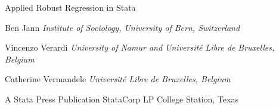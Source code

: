 {

\noindent
{\Huge
Applied Robust Regression in Stata

}

\vfill

\noindent
Ben Jann\hfil\break
{\it Institute of Sociology, University of Bern, Switzerland}

\bigskip

\noindent
Vincenzo Verardi\hfil\break
{\it University of Namur and Universit\'{e} Libre de Bruxelles, Belgium}

\bigskip

\noindent
Catherine Vermandele\hfil\break
{\it Universit\'{e} Libre de Bruxelles, Belgium}

\vfill

\noindent
{}

\noindent
A Stata Press Publication\hfil\break
StataCorp LP\hfil\break
College Station, Texas

}
\endinput

